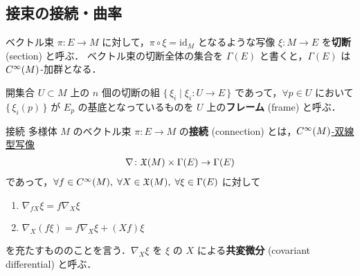 \documentclass[geometry_main]{subfiles}
\begin{document}


\subsection{接束の接続・曲率}

ベクトル束 $\pi \colon E \to M$ に対して，$\pi \circ \xi = \mathrm{id}_{M}$ となるような\cinfty 写像 $\xi \colon M \to E$ を\textbf{切断} (section) と呼ぶ．
ベクトル束の切断全体の集合を $\Gamma(E)$ と書くと，$\Gamma(E)$ は $C^\infty(M)$-加群となる．

開集合 $U\subset M$ 上の $n$ 個の切断の組 $\{\, \xi_i \mid \xi_i \colon U \to E\, \}$ であって，$\forall p \in U$ において $\{\,\xi_i (p)\,\}$ が $E_p$ の基底となっているものを $U$ 上の\textbf{フレーム} (frame) と呼ぶ．

\begin{mydef}[label=def.connection]{接続}
	\cinfty 多様体 $M$ のベクトル束 $\pi \colon E \to M$ の\textbf{接続} (connection) とは，\underline{$C^\infty(M)$-双線型写像}
	\begin{align} 
		\nabla \colon \mathfrak{X}(M) \times \Gamma(E) \to \Gamma(E)
	\end{align}
	であって，$\forall f \in C^\infty(M),\; \forall X \in \mathfrak{X}(M),\; \forall \xi \in \Gamma(E)$ に対して
	\begin{enumerate} 
		\item $\nabla_{fX} \xi = f \nabla_X \xi$
		\item $\nabla_{X}(f\xi) = f \nabla_X \xi + (Xf) \xi$
	\end{enumerate}
	を充たすもののことを言う．$\nabla_X \xi$ を $\xi$ の $X$ による\textbf{共変微分} (covariant differential) と呼ぶ．
\end{mydef}
\end{document}
